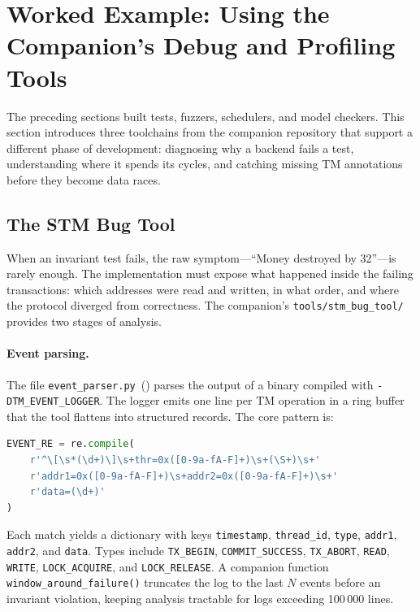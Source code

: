 \section{Worked Example: Using the Companion's Debug and Profiling Tools}
\label{sec:debug-profiling-tools}

The preceding sections built tests, fuzzers, schedulers, and model
checkers.  This section introduces three toolchains from the companion
repository that support a different phase of development: diagnosing why
a backend fails a test, understanding where it spends its cycles, and
catching missing TM annotations before they become data races.

\subsection{The STM Bug Tool}
\label{sec:stm-bug-tool}

When an invariant test fails, the raw symptom---``Money destroyed by
32''---is rarely enough.  The implementation must expose what happened
inside the failing transactions: which addresses were read and written,
in what order, and where the protocol diverged from correctness.  The
companion's \texttt{tools/stm\_bug\_tool/} provides two stages of
analysis.

\paragraph{Event parsing.}
The file \texttt{event\_parser.py}~()
parses the output of a binary compiled with \texttt{-DTM\_EVENT\_LOGGER}.
The logger emits one line per TM operation in a ring buffer that the
tool flattens into structured records.  The core pattern is:

\begin{lstlisting}[language=Python, caption={Event regex from event\_parser.py.}]
EVENT_RE = re.compile(
    r'^\[\s*(\d+)\]\s+thr=0x([0-9a-fA-F]+)\s+(\S+)\s+'
    r'addr1=0x([0-9a-fA-F]+)\s+addr2=0x([0-9a-fA-F]+)\s+'
    r'data=(\d+)'
)
\end{lstlisting}

\noindent
Each match yields a dictionary with keys \texttt{timestamp},
\texttt{thread\_id}, \texttt{type}, \texttt{addr1}, \texttt{addr2},
and \texttt{data}.  Types include \texttt{TX\_BEGIN},
\texttt{COMMIT\_SUCCESS}, \texttt{TX\_ABORT}, \texttt{READ},
\texttt{WRITE}, \texttt{LOCK\_ACQUIRE}, and \texttt{LOCK\_RELEASE}.
A companion function \texttt{window\_around\_failure()} truncates the
log to the last $N$ events before an invariant violation, keeping
analysis tractable for logs exceeding 100\,000 lines.

